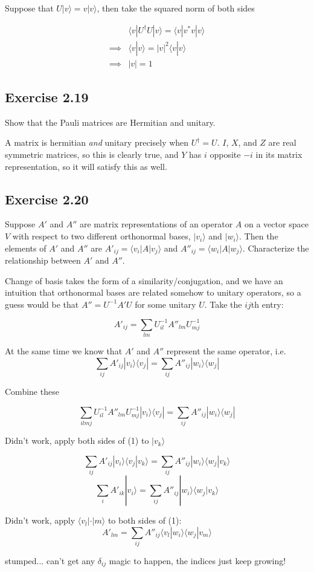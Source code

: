 \documentclass[]{article}
\newcommand{\bra}[1]{\langle #1 |}
\newcommand{\ket}[1]{| #1 \rangle}
\newcommand{\braket}[2]{\langle #1 | #2 \rangle}
\newcommand{\ord}[1]{\left| #1 \right|}
\begin{document}
Suppose that $U\ket{v} = v\ket{v}$, then take the squared norm of both sides

\begin{align*}
&\bra{v}U^\dagger U\ket{v} = \bra{v} v^*v \ket{v} \\
\implies &\braket{v}{v} = \ord{v}^2\braket{v}{v} \\
\implies &\ord{v} = 1
\end{align*}

\subsection{Exercise 2.19}
Show that the Pauli matrices are Hermitian and unitary.

A matrix is hermitian \textit{and} unitary precisely when $U^\dagger = U$. $I$, $X$, and $Z$ are real symmetric matrices, so this is clearly true, and $Y$ has $i$ opposite $-i$ in its matrix representation, so it will satisfy this as well.

\subsection{Exercise 2.20}

Suppose $A'$ and $A''$ are matrix representations of an operator $A$ on a vector space $V$ with respect to two different orthonormal bases, $\ket{v_i}$ and $\ket{w_i}$. Then the elements of $A'$ and $A''$ are $A'_{ij} = \bra{v_i}A\ket{v_j}$ and $A''_{ij} = \bra{w_i}A\ket{w_j}$. Characterize the relationship between $A'$ and $A''$.

Change of basis takes the form of a similarity/conjugation, and we have an intuition that orthonormal bases are related somehow to unitary operators, so a guess would be that $A'' = U^{-1}A'U$ for some unitary $U$. Take the $ij$th entry:

\[A'_{ij} = \sum_{lm} U^{-1}_{il}A''_{lm}U^{-1}_{mj}\]

At the same time we know that $A'$ and $A''$ represent the same operator, i.e.
\begin{equation}
\sum_{ij} A'_{ij}\ket{v_i}\bra{v_j} = \sum_{ij} A''_{ij}\ket{w_i}\bra{w_j}
\end{equation}

Combine these 

\[\sum_{ilmj} U^{-1}_{il}A''_{lm}U^{-1}_{mj}\ket{v_i}\bra{v_j} = \sum_{ij} A''_{ij}\ket{w_i}\bra{w_j}\]


Didn't work, apply both sides of (1) to $\ket{v_k}$

\[\sum_{ij} A'_{ij}\ket{v_i}\braket{v_j}{v_k} = \sum_{ij} A''_{ij}\ket{w_i}\braket{w_j}{v_k}\]
\[\sum_{i} A'_{ik}\ket{v_i} = \sum_{ij} A''_{ij}\ket{w_i}\braket{w_j}{v_k}\]

Didn't work, apply $\bra{v_l}\cdot\ket{m}$ to both sides of (1):
\[A'_{lm} = \sum_{ij} A''_{ij}\braket{v_l}{w_i}\braket{w_j}{v_m}\]

stumped... can't get any $\delta_{ij}$ magic to happen, the indices just keep growing!
\end{document}
